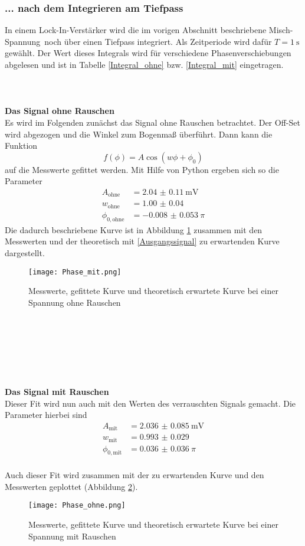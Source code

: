 \subsubsection{... nach dem Integrieren am Tiefpass}
In einem Lock-In-Verstärker wird die im vorigen Abschnitt beschriebene \glqq Misch-Spannung\grqq\ noch über einen Tiefpass integriert. Als Zeitperiode wird dafür $T = \SI{1}{\second}$ gewählt. Der Wert dieses Integrals wird für verschiedene Phasenverschiebungen abgelesen und ist in Tabelle \ref{Integral_ohne} bzw. \ref{Integral_mit} eingetragen. \\
\ \\
\ \\
\ \\
\textbf{Das Signal ohne Rauschen} \\
Es wird im Folgenden zunächst das Signal ohne Rauschen betrachtet. Der Off-Set wird abgezogen und die Winkel zum Bogenmaß überführt. Dann kann die Funktion
\[f(\phi) = A\cos(w\phi+\phi_0)\]
auf die Messwerte gefittet werden. Mit Hilfe von Python ergeben sich so die Parameter
\begin{align}
	A_\text{ohne} &= \SI{2.04(011)}{\milli\volt} \\
	w_\text{ohne} &= \SI{1.00(004)}{} \\
	\phi_{0,\text{ohne}} &= \SI{-0.008(53)}{\pi}
\end{align}
Die dadurch beschriebene Kurve ist in Abbildung \ref{Fit_ohne} zusammen mit den Messwerten und der theoretisch mit \eqref{Ausgangssignal} zu erwartenden Kurve dargestellt. \\

\begin{figure}[h!]
	\texttt{[image: Phase\_mit.png]}
	\caption{Messwerte, gefittete Kurve und theoretisch erwartete Kurve bei einer Spannung ohne Rauschen}
	\label{Fit_ohne}
\end{figure} \\
\ \\
\ \\
\ \\
\ \\
\ \\
\textbf{Das Signal mit Rauschen} \\
Dieser Fit wird nun auch mit den Werten des verrauschten Signals gemacht. Die Parameter hierbei sind
\begin{align}
	A_\text{mit} &= \SI{2.036(0085)}{\milli\volt} \\
	w_\text{mit} &= \SI{0.993(0029)}{} \\
	\phi_{0,\text{mit}} &= \SI{0.036(0036)}{\pi}
\end{align}
 \\
Auch dieser Fit wird zusammen mit der zu erwartenden Kurve und den Messwerten geplottet (Abbildung \ref{Fit_mit}).
\begin{figure}[h!]
	\texttt{[image: Phase\_ohne.png]}
	\caption{Messwerte, gefittete Kurve und theoretisch erwartete Kurve bei einer Spannung mit Rauschen}
	\label{Fit_mit}
\end{figure}
\clearpage
